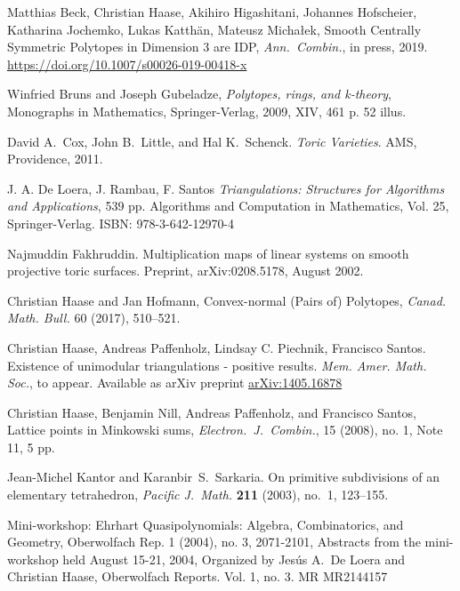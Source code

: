 \documentclass{amsart}
\theoremstyle{plain}
\theoremstyle{definition}
\begin{document}
\begin{thebibliography}{99} 

Matthias Beck, Christian Haase, Akihiro Higashitani, Johannes Hofscheier, Katharina Jochemko, Lukas Katth\"an, Mateusz Micha{\l}ek,
Smooth Centrally Symmetric Polytopes in Dimension 3 are IDP,
\emph{Ann.~Combin.}, in press, 2019.
\url{https://doi.org/10.1007/s00026-019-00418-x}

Winfried Bruns and Joseph Gubeladze, \emph{Polytopes, rings, and k-theory}, Monographs in Mathematics,
  Springer-Verlag, 2009, XIV, 461 p. 52 illus.
  
David A.~Cox, John B.~Little, and Hal K.~Schenck.
{\em {T}oric {V}arieties}.
AMS, Providence, 2011.

J. A. De Loera, J. Rambau, F. Santos
\emph{Triangulations: Structures for Algorithms and Applications}, 539 pp.
Algorithms and Computation in Mathematics, Vol. 25, Springer-Verlag. 
ISBN: 978-3-642-12970-4

Najmuddin Fakhruddin.
\newblock Multiplication maps of linear systems on smooth projective toric surfaces.
  Preprint, arXiv:0208.5178, August 2002.


Christian Haase and Jan Hofmann, 
Convex-normal (Pairs of) Polytopes, 
\emph{Canad. Math. Bull.} 60 (2017), 510--521.

Christian Haase, Andreas Paffenholz, Lindsay C. Piechnik, Francisco Santos. Existence of unimodular triangulations - positive results. 
 \emph{Mem. Amer. Math. Soc.}, to appear.
 Available as arXiv preprint \href{https://arxiv.org/abs/1405.1687}{arXiv:1405.16878}
 
Christian Haase, Benjamin Nill, Andreas Paffenholz, and Francisco Santos, Lattice points in Minkowski sums, 
\emph{Electron.~J.~Combin.}, 15 (2008), no. 1, Note 11, 5 pp.

Jean-Michel Kantor and Karanbir~S.\ Sarkaria.
On primitive subdivisions of an elementary tetrahedron, 
\emph{Pacific J.~Math.} \textbf{211} (2003), no.~1,  123--155.

Mini-workshop: Ehrhart Quasipolynomials: Algebra, Combinatorics, and Geometry, Oberwolfach Rep. 1 (2004), no. 3, 2071-2101, Abstracts from the mini-workshop held August 15-21, 2004, Organized by Jes\'us A.~De Loera and Christian Haase, Oberwolfach Reports. Vol. 1, no. 3. MR MR2144157


\end{thebibliography}
\end{document}
